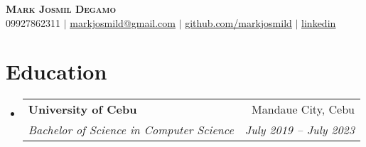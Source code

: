 \documentclass[letterpaper,11pt]{article}
\makeatletter
\newcommand{\resumeSubheading}[4]{
  \vspace{-2pt}\item
    \begin{tabular*}{0.97\textwidth}[t]{l@{\extracolsep{\fill}}r}
      \textbf{#1} & #2 \\
      \textit{\small#3} & \textit{\small #4} \\
    \end{tabular*}\vspace{-7pt}
}
\newcommand{\resumeSubHeadingListStart}{\begin{itemize}[leftmargin=0.15in, label={}]}
\newcommand{\resumeSubHeadingListEnd}{\end{itemize}}
\makeatother
\begin{document}

\begin{center}
    \textbf{\Huge \scshape Mark Josmil Degamo} \\ \vspace{1pt}
    \small 09927862311 $|$ 
    \href{mailto:markjosmild@gmail.com}
    {\underline{markjosmild@gmail.com}} $|$ 
    \href{https://www.linkedin.com/in/mark-josmil-degamo-97a05a273/}
    {\underline{github.com/markjosmild}} $|$ 
    \href{https://www.linkedin.com/in/mark-josmil-degamo-97a05a273/}
    {\underline{linkedin}}  
\end{center}

\section{Education}
  \resumeSubHeadingListStart
    \resumeSubheading
      {University of Cebu}{Mandaue City, Cebu}
      {Bachelor of Science in Computer Science}{July 2019 -- July 2023}
  \resumeSubHeadingListEnd
  

\end{document}
